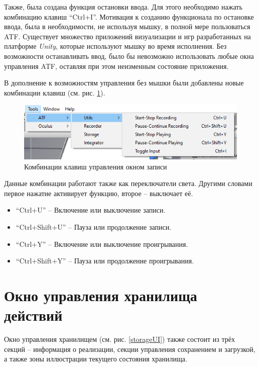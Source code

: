 Также, была создана функция остановки ввода. Для этого необходимо нажать комбинацию клавиш ``Ctrl+I''. Мотивация к созданию функционала по остановке ввода, была в необходимости, не используя мышку, в полной мере пользоваться ATF. Существует множество приложений визуализации и игр разработанных на платформе \textit{Unity}, которые используют мышку во время исполнения. Без возможности останавливать ввод, было бы невозможно использовать любые окна управления ATF, оставляя при этом неизменным состояние приложения.

В дополнение к возможностям управления без мышки были добавлены новые комбинации клавиш (см. рис. \ref{shortcuts}).

\begin{figure}[h]
	\centering
	\includegraphics[width=\linewidth]{shortcuts.png}
	\caption{Комбинации клавиш управления окном записи}
	\label{shortcuts}
\end{figure}

Данные комбинации работают также как переключатели света. Другими словами первое нажатие активирует функцию, второе -- выключает её.
\begin{itemize}
	\item ``Ctrl+U'' -- Включение или выключение записи.
	\item ``Ctrl+Shift+U'' -- Пауза или продолжение записи.
	\item ``Ctrl+Y'' -- Включение или выключение проигрывания.
	\item ``Ctrl+Shift+Y'' -- Пауза или продолжение проигрывания.
\end{itemize}

\section{Окно управления хранилища действий}
Окно управления хранилищем (см. рис. \ref{storageUI}) также состоит из трёх секций -- информация о реализации, секции управления сохранением и загрузкой, а также зоны иллюстрации текущего состояния хранилища.

